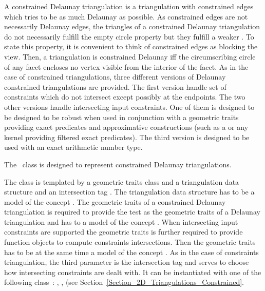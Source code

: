 \label{Subsection_2D_Triangulations_Constrained_Delaunay_Description}
A constrained Delaunay triangulation is a triangulation with
constrained edges which tries to be as much Delaunay as possible.
As constrained edges are not necessarily Delaunay edges,
the triangles of a constrained Delaunay triangulation do not
necessarily fulfill the empty circle property
but they fulfill a weaker .
 To state this property,
it is convenient to think of  constrained
edges as blocking the view. Then, a triangulation is 
constrained Delaunay iff
 the circumscribing circle
of any facet encloses 
no vertex  visible
from the interior of the facet.
As in the case of constrained triangulations, three different versions
of Delaunay constrained triangulations are provided. The first version
handle set of constraints which do not intersect except possibly
at the endpoints. The two other versions 
handle intersecting input constraints. One of them
 is designed to be designed to be robust
when used in conjunction with a geometric traits
providing exact predicates and approximative constructions
(such as a  or any kernel providing
filtered exact predicates). The third version is designed to be used
with an exact arithmetic number type.




The \cgal\ class
is designed to represent
constrained Delaunay triangulations.

The class is templated by a geometric traits class 
and a triangulation data structure  and an intersection tag 
.
The triangulation data structure has to be a model of the concept
.
 The geometric traits 
of a constrained Delaunay triangulation is required
to provide the  test as the geometric traits
of a Delaunay triangulation and has to a model of the concept
. When intersecting input
constraints
are supported the geometric traits is further required 
to provide function objects to compute constraints intersections.
Then the geometric traits has to be at the same time a model
of the concept .
As in the case of constraints triangulation, the third parameter 
 is the intersection tag
and serves to choose how intersecting constraints
are dealt with. It can be instantiated with one of the following
class~: ,
,
(see Section~\ref{Section_2D_Triangulations_Constrained}.

